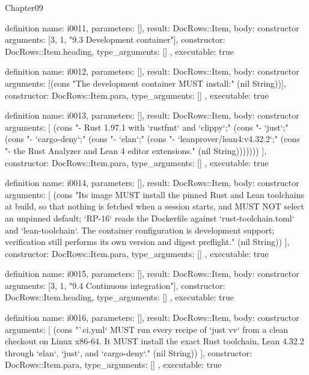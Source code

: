 \begin{lexlean}{Chapter09}
\begin{semanticmodule}
definition{
  name: i0011,
  parameters: [],
  result: DocRows::Item,
  body: constructor{
    arguments: [3, 1, "9.3 Development container"],
    constructor: DocRows::Item.heading,
    type_arguments: []
  },
  executable: true
}

definition{
  name: i0012,
  parameters: [],
  result: DocRows::Item,
  body: constructor{
    arguments: [(cons "The development container MUST install:" (nil String))],
    constructor: DocRows::Item.para,
    type_arguments: []
  },
  executable: true
}

definition{
  name: i0013,
  parameters: [],
  result: DocRows::Item,
  body: constructor{
    arguments: [
      (cons "- Rust 1.97.1 with `rustfmt` and `clippy`;" (cons "- `just`;" (cons "- `cargo-deny`;" (cons "- `elan`;" (cons "- `leanprover/lean4:v4.32.2`;" (cons "- the Rust Analyzer and Lean 4 editor extensions." (nil String)))))))
    ],
    constructor: DocRows::Item.para,
    type_arguments: []
  },
  executable: true
}

definition{
  name: i0014,
  parameters: [],
  result: DocRows::Item,
  body: constructor{
    arguments: [
      (cons "Its image MUST install the pinned Rust and Lean toolchains at build, so that nothing is fetched when a session starts, and MUST NOT select an unpinned default; `RP-16` reads the Dockerfile against `rust-toolchain.toml` and `lean-toolchain`. The container configuration is development support; verification still performs its own version and digest preflight." (nil String))
    ],
    constructor: DocRows::Item.para,
    type_arguments: []
  },
  executable: true
}

definition{
  name: i0015,
  parameters: [],
  result: DocRows::Item,
  body: constructor{
    arguments: [3, 1, "9.4 Continuous integration"],
    constructor: DocRows::Item.heading,
    type_arguments: []
  },
  executable: true
}

definition{
  name: i0016,
  parameters: [],
  result: DocRows::Item,
  body: constructor{
    arguments: [
      (cons "`ci.yml` MUST run every recipe of `just vv` from a clean checkout on Linux x86-64. It MUST install the exact Rust toolchain, Lean 4.32.2 through `elan`, `just`, and `cargo-deny`." (nil String))
    ],
    constructor: DocRows::Item.para,
    type_arguments: []
  },
  executable: true
}


\end{semanticmodule}
\end{lexlean}
